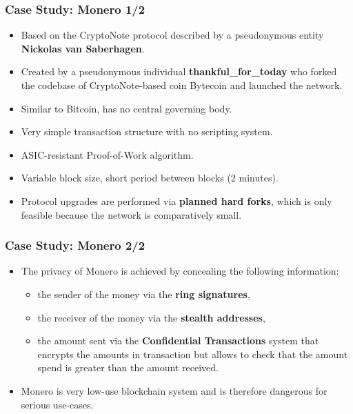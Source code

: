 \documentclass{beamer}
\begin{document}
\begin{frame}
  \frametitle{Case Study: Monero 1/2}
  \begin{itemize}
  \item Based on the CryptoNote protocol described by a pseudonymous entity
    \textbf{Nickolas van Saberhagen}.
  \item Created by a pseudonymous individual \textbf{thankful\_for\_today} who
    forked the codebase of CryptoNote-based coin Bytecoin and launched the
    network.
  \item Similar to Bitcoin, has no central governing body.
  \item Very simple transaction structure with no scripting system.
  \item ASIC-resistant Proof-of-Work algorithm.
  \item Variable block size, short period between blocks (2 minutes).
  \item Protocol upgrades are performed via \textbf{planned hard forks}, which
    is only feasible because the network is comparatively small.
  \end{itemize}
\end{frame}

\begin{frame}
  \frametitle{Case Study: Monero 2/2}
  \begin{itemize}
  \item The privacy of Monero is achieved by concealing the following
    information:
    \begin{itemize}
    \item the sender of the money via the \textbf{ring signatures},
    \item the receiver of the money via the \textbf{stealth addresses},
    \item the amount sent via the \textbf{Confidential Transactions} system that
      encrypts the amounts in transaction but allows to check that the amount
      spend is greater than the amount received.
    \end{itemize}
  \item Monero is very low-use blockchain system and is therefore dangerous for
    serious use-cases.
  \end{itemize}
\end{frame}
\end{document}
